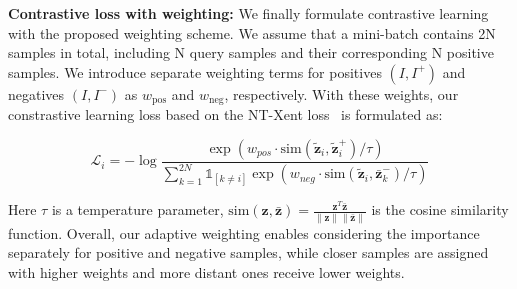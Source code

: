 \textbf{Contrastive loss with weighting:} We finally formulate contrastive learning with the proposed weighting scheme. We assume that a mini-batch contains 2N samples in total, including N query samples and their corresponding N positive samples. We introduce separate weighting terms for positives $(I, I^+)$ and negatives $(I, I^-)$ as \( w_{\text{pos}} \) and \( w_{\text{neg}} \), respectively. With these weights, our constrastive learning loss based on the NT-Xent loss~\citep{chen:icml20} is formulated as:

\begin{equation} 
\label{eq:cl_loss_w_weighting} 
    \mathcal{L}_{i} = -\log \frac{\exp \left( w_{pos} \cdot \text{sim}(\tilde{\mathbf{z}}_{i}, \tilde{\mathbf{z}}^{+}_{i}) / \tau \right)} {\sum_{k=1}^{2N} \mathbb{1}_{[k\neq i]} \exp \left( w_{neg} \cdot \text{sim}(\tilde{\mathbf{z}}_{i}, \bar{\mathbf{z}}^{-}_{k}) / \tau \right)} 
\end{equation}

Here \( \tau \) is a temperature parameter, \( \text{sim}(\mathbf{z}, \bar{\mathbf{z}}) = \frac{\mathbf{z}^T \bar{\mathbf{z}}}{\|\mathbf{z}\|\|\bar{\mathbf{z}}\|} \) is the cosine similarity function. Overall, our adaptive weighting enables considering the importance separately for positive and negative samples, while closer samples are assigned with higher weights and more distant ones receive lower weights.